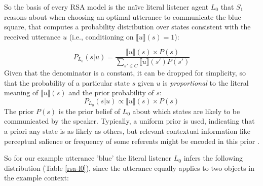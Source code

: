 So the basis of every RSA model is the na\"ive literal listener agent $L_0$ that $S_1$ reasons about when choosing an optimal utterance to communicate the blue square, that computes a probability distribution over states consistent with the received utterance $u$ (i.e., conditioning on $\llbracket u \rrbracket (s) = 1$): %

$$P_{L_0}(s | u) = \frac{\llbracket u \rrbracket (s) \times P(s)}{\sum_{s' \in C} \llbracket u \rrbracket (s') P(s')}$$
Given that the denominator is a constant, it can be dropped for simplicity, so that the probability of a particular state $s$ given $u$ is \emph{proportional} to the literal meaning of $\llbracket u \rrbracket (s)$ and the prior probability of $s$: 
$$P_{L_0}(s | u) \propto \llbracket u \rrbracket (s) \times P(s)$$
The prior $P(s)$ is the prior belief of $L_0$ about which states are likely to be communicated by the speaker. Typically, a uniform prior is used, indicating that a priori any state is as likely as others, but relevant contextual information like perceptual salience or frequency of some referents might be encoded in this prior \parencite{frank2012predicting}.
  
So for our example utterance 'blue' the literal listener $L_0$ infers the following distribution (Table \ref{rsa-l0}), since the utterance equally applies to two objects in the example context:

